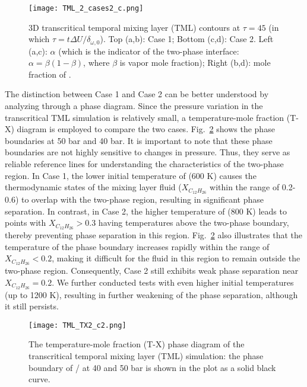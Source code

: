 \begin{figure}[htbp]
	\centering
	\texttt{[image: TML\_2\_cases2\_c.png]}
	\caption{3D transcritical temporal mixing layer (TML) contours at $\tau = 45$ (in which $\tau = t \Delta U/ \delta_{\omega,0}$). Top (a,b): Case 1; Bottom (c,d): Case 2. Left (a,c): $\alpha$ (which is the indicator of the two-phase interface: $\alpha = \beta(1-\beta)$, where $\beta$ is vapor mole fraction); Right (b,d): mole fraction of .}
	\label{TML_3D_result}
\end{figure}

The distinction between Case 1 and Case 2 can be better understood by analyzing through a phase diagram. Since the pressure variation in the transcritical TML simulation is relatively small, a temperature-mole fraction (T-X) diagram is employed to compare the two cases. Fig.~\ref{TML_TX} shows the phase boundaries at 50 bar and 40 bar. It is important to note that these phase boundaries are not highly sensitive to changes in pressure. Thus, they serve as reliable reference lines for understanding the characteristics of the two-phase region. In Case 1, the lower initial temperature of  (600 K) causes the thermodynamic states of the mixing layer fluid ($X_{C_{12}H_{26}}$ within the range of 0.2-0.6) to overlap with the two-phase region, resulting in significant phase separation. In contrast, in Case 2, the higher temperature of  (800 K) leads to points with $X_{C_{12}H_{26}}>0.3$ having temperatures above the two-phase boundary, thereby preventing phase separation in this region. Fig.~\ref{TML_TX} also illustrates that the temperature of the phase boundary increases rapidly within the range of $X_{C_{12}H_{26}}<0.2$, making it difficult for the fluid in this region to remain outside the two-phase region. Consequently, Case 2 still exhibits weak phase separation near $X_{C_{12}H_{26}}=0.2$. We further conducted tests with even higher initial  temperatures (up to 1200 K), resulting in further weakening of the phase separation, although it still persists.


\begin{figure}[htbp]
	\centering
	\texttt{[image: TML\_TX2\_c2.png]}
	\caption{The temperature-mole fraction (T-X) phase diagram of the transcritical temporal mixing layer (TML) simulation: the phase boundary of / at 40 and 50 bar is shown in the plot as a solid black curve.}
	\label{TML_TX}
\end{figure}

